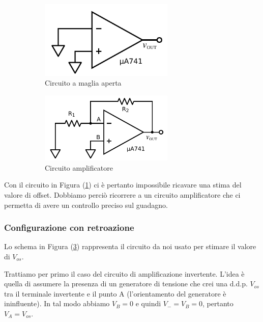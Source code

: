 \begin{figure}[ht]
        \centering
        \begin{subfigure}[b]{0.35\textwidth}
		\centering
                    \includegraphics[width=0.70\textwidth]{../E02/latex/open_loop.pdf}
                \caption{Circuito a maglia aperta}
                \label{cir:open_loop}
        \end{subfigure}%
    \quad
        \begin{subfigure}[b]{0.35\textwidth}
		\centering
		    \includegraphics[width=0.70\textwidth]{../E02/latex/inv.pdf}
                \caption{Circuito amplificatore}
                \label{cir:inv}
        \end{subfigure}
	\caption{}
\end{figure}

Con il circuito in Figura (\ref{cir:open_loop}) ci è pertanto impossibile ricavare una stima del valore di offset.
Dobbiamo perciò ricorrere a un circuito amplificatore che ci permetta di avere un controllo preciso sul guadagno.

\subsubsection{Configurazione con retroazione}

Lo schema in Figura (\ref{cir:inv}) rappresenta il circuito da noi usato per stimare il valore di $V_{os}$.

Trattiamo per primo il caso del circuito di amplificazione invertente.
L'idea è quella di assumere la presenza di un generatore di tensione che crei una d.d.p. $V_{os}$ tra il terminale invertente e il punto A (l'orientamento del generatore è ininfluente).
In tal modo abbiamo $V_B=0$ e quindi $V_-=V_B=0$, pertanto $V_A = V_{os}$.

